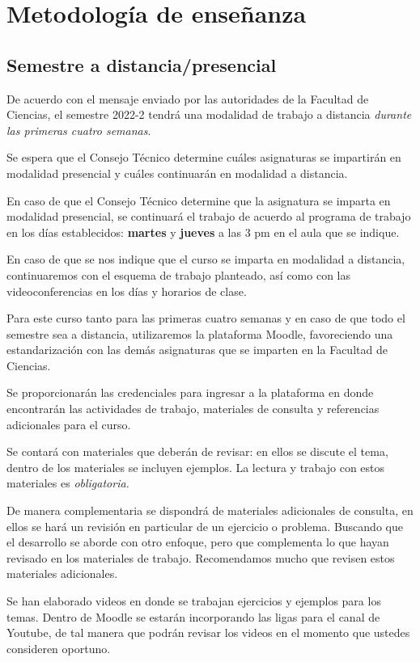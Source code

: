 \section{Metodología de enseñanza}

\subsection{Semestre a distancia/presencial}

De acuerdo con el mensaje enviado por las autoridades de la Facultad de Ciencias, el semestre 2022-2 tendrá una modalidad de trabajo a distancia \emph{durante las primeras cuatro semanas}.
\par
Se espera que el Consejo Técnico determine cuáles asignaturas se impartirán en modalidad presencial y cuáles continuarán en modalidad a distancia.
\par
En caso de que el Consejo Técnico determine que la asignatura se imparta en modalidad presencial, se continuará el trabajo de acuerdo al programa de trabajo en los días establecidos: \textbf{martes} y \textbf{jueves}  a las 3 pm en el aula que se indique.
\par
En caso de que se nos indique que el curso se imparta en modalidad a distancia, continuaremos con el esquema de trabajo planteado, así como con las videoconferencias en los días y horarios de clase. 




Para este curso tanto para las primeras cuatro semanas y en caso de que todo el semestre sea a distancia,  utilizaremos la plataforma Moodle, favoreciendo una estandarización con las demás asignaturas que se imparten en la Facultad de Ciencias.
\par
Se proporcionarán las credenciales para ingresar a la plataforma en donde encontrarán las actividades de trabajo, materiales de consulta y referencias adicionales para el curso.
\par
Se contará con materiales que deberán de revisar: en ellos se discute el tema, dentro de los materiales se incluyen ejemplos. La lectura y trabajo con estos materiales es \emph{obligatoria.}
\par
De manera complementaria se dispondrá de materiales adicionales de consulta, en ellos se hará un revisión en particular de un ejercicio o problema. Buscando que el desarrollo se aborde con otro enfoque, pero que complementa lo que hayan revisado en los materiales de trabajo. Recomendamos mucho que revisen estos materiales adicionales.
\par
Se han elaborado videos en donde se trabajan ejercicios y ejemplos para los temas. Dentro de Moodle se estarán incorporando las ligas para el canal de Youtube, de tal manera que podrán revisar los videos en el momento que ustedes consideren oportuno.

